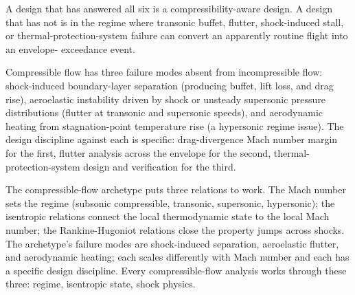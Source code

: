 A design that has answered all six is a compressibility-aware
design. A design that has not is in the regime where transonic
buffet, flutter, shock-induced stall, or thermal-protection-system
failure can convert an apparently routine flight into an envelope-
exceedance event.

\begin{principle}
Compressible flow has three failure modes absent from
incompressible flow: shock-induced boundary-layer separation
(producing buffet, lift loss, and drag rise), aeroelastic
instability driven by shock or unsteady supersonic pressure
distributions (flutter at transonic and supersonic speeds), and
aerodynamic heating from stagnation-point temperature rise (a
hypersonic regime issue). The design discipline against each is
specific: drag-divergence Mach number margin for the first,
flutter analysis across the envelope for the second,
thermal-protection-system design and verification for the third.
\end{principle}

\begin{archetype}
The compressible-flow archetype puts three relations to work. The
Mach number sets the regime (subsonic compressible, transonic,
supersonic, hypersonic); the isentropic relations connect the
local thermodynamic state to the local Mach number; the
Rankine-Hugoniot relations close the property jumps across shocks.
The archetype's failure modes are shock-induced separation,
aeroelastic flutter, and aerodynamic heating; each scales
differently with Mach number and each has a specific design
discipline. Every compressible-flow analysis works through these
three: regime, isentropic state, shock physics.
\end{archetype}

